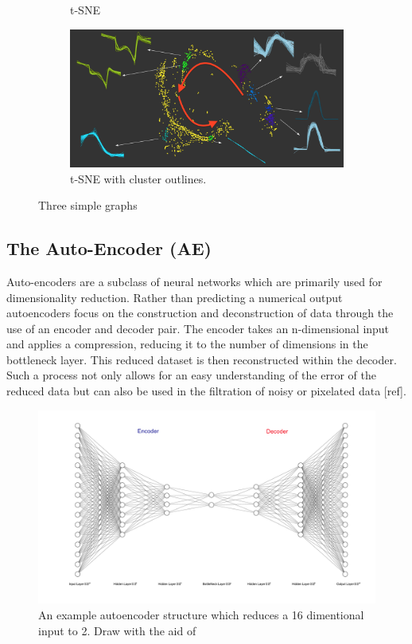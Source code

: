 \begin{figure}[H]
\begin{subfigure}[b]{0.495\textwidth}
         \caption{t-SNE}
         \label{fig:tsnec}
     \end{subfigure}
     \hfill \hfill
     \begin{subfigure}[b]{\textwidth}
         \centering
         \includegraphics[width=\textwidth]{4fig/ptsneall.png}
         \caption{t-SNE with cluster outlines.}
         \label{fig:tco}
     \end{subfigure}
        \caption{Three simple graphs}
        \label{fig:threegraphs}
\end{figure}




\subsection{The Auto-Encoder (AE)}
Auto-encoders are a subclass of neural networks which are primarily used for dimensionality reduction. Rather than predicting a numerical output autoencoders focus on the construction and deconstruction of data through the use of an encoder and decoder pair. The encoder takes an n-dimensional input and applies a compression, reducing it to the number of dimensions in the bottleneck layer. This reduced dataset is then reconstructed within the decoder. Such a process not only allows for an easy understanding of the error of the reduced data but can also be used in the filtration of noisy or pixelated data [ref].\\


\begin{figure}[H]
\includegraphics[width=\textwidth]{4fig/ae.pdf}
\caption{An example autoencoder structure which reduces a 16 dimentional input to 2. Draw with the aid of \citep{drawae}}
\end{figure}


